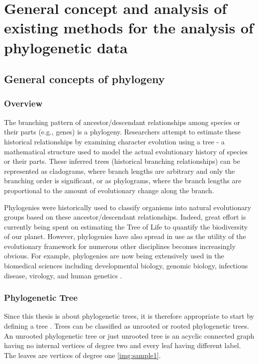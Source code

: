 \chapter{General concept and analysis of existing 
methods for the analysis of phylogenetic data}

\newtheorem{defi}{Definition} %

\section{General concepts of phylogeny}
\subsection{Overview}

The branching pattern of ancestor/descendant relationships among species or
their parts (e.g., genes) is a phylogeny. Researchers attempt to estimate these 
historical relationships by examining character evolution using a tree - a mathematical
structure used to model the actual evolutionary history of species or their parts.
These inferred trees (historical branching relationships) can be represented as 
cladograms, where branch lengths are arbitrary and only the branching order is significant,
or as phylograms, where the branch lengths are proportional to the amount of evolutionary 
change along the branch.

Phylogenies were historically used to classify organisms into natural evolutionary
groups based on these ancestor/descendant relationships. Indeed, great effort is
currently being spent on estimating the Tree of Life to quantify the biodiversity of
our planet. However, phylogenies have also spread in use as the utility of the
evolutionary framework for numerous other disciplines becomes increasingly obvious. 
For example, phylogenies are now being extensively used in the biomedical sciences 
including developmental biology, genomic biology, infectious disease, virology,
and human genetics \cite{jumpstarting}.

\subsection{Phylogenetic Tree}
Since this thesis is about phylogenetic trees, it is therefore 
appropriate to start by defining a tree \cite{alkim}. 
Trees can be classified as unrooted or rooted phylogenetic trees. An 
unrooted phylogenetic tree or just unrooted tree is an acyclic connected 
graph having no internal vertices of degree two and every leaf having 
different label. The leaves are vertices of degree one \ref{img:sample1}.

